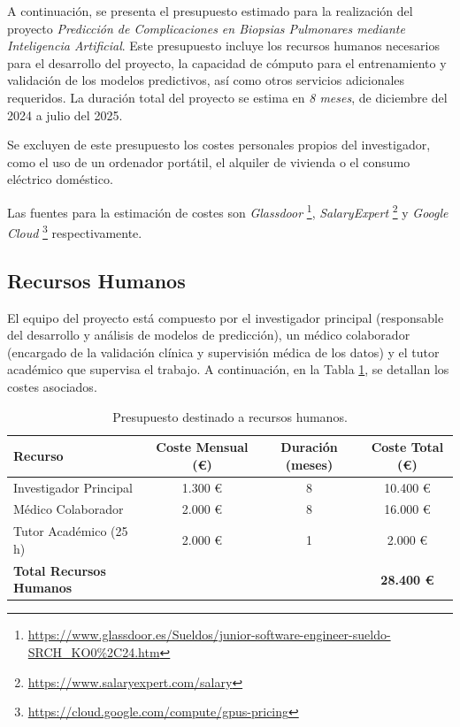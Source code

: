 A continuación, se presenta el presupuesto estimado para la realización del proyecto \textit{Predicción de Complicaciones en Biopsias Pulmonares mediante Inteligencia Artificial}. Este presupuesto incluye los recursos humanos necesarios para el desarrollo del proyecto, la capacidad de cómputo para el entrenamiento y validación de los modelos predictivos, así como otros servicios adicionales requeridos. La duración total del proyecto se estima en \textit{8 meses}, de diciembre del 2024 a julio del 2025. 

Se excluyen de este presupuesto los costes personales propios del investigador, como el uso de un ordenador portátil, el alquiler de vivienda o el consumo eléctrico doméstico.

Las fuentes para la estimación de costes son \textit{Glassdoor} \footnote{\url{https://www.glassdoor.es/Sueldos/junior-software-engineer-sueldo-SRCH_KO0\%2C24.htm}}, \textit{SalaryExpert} \footnote{\url{https://www.salaryexpert.com/salary}} y \textit{Google Cloud} \footnote{\url{https://cloud.google.com/compute/gpus-pricing}} respectivamente.

\subsection{Recursos Humanos}

El equipo del proyecto está compuesto por el investigador principal (responsable del desarrollo y análisis de modelos de predicción), un médico colaborador (encargado de la validación clínica y supervisión médica de los datos) y el tutor académico que supervisa el trabajo. A continuación, en la Tabla \ref{tab:recursos-humanos}, se detallan los costes asociados.

\begin{table}[!htbp]
    \centering
    \begin{tabular}{|l|c|c|c|}
        \hline
        \textbf{Recurso} & \textbf{Coste Mensual (€)} & \textbf{Duración (meses)} & \textbf{Coste Total (€)} \\ \hline
        Investigador Principal & 1.300 € & 8 & 10.400 € \\ 
        Médico Colaborador    & 2.000 € & 8 & 16.000 € \\ 
        Tutor Académico (25 h) & 2.000 € & 1 & 2.000 € \\ \hline
        \textbf{Total Recursos Humanos} & & & \textbf{28.400 €} \\ \hline
    \end{tabular}
    \caption{Presupuesto destinado a recursos humanos.}
    \label{tab:recursos-humanos}
\end{table}

